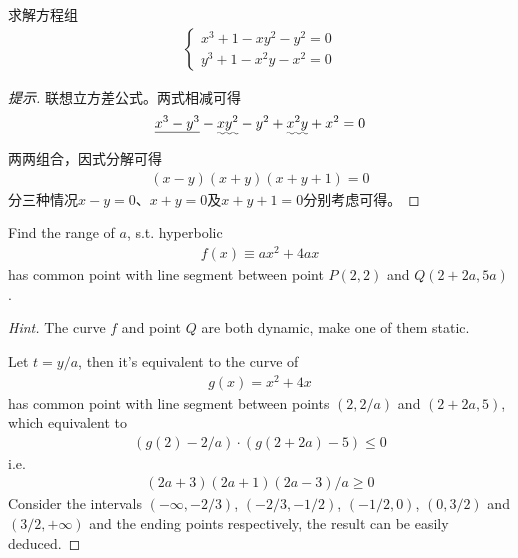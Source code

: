 \begin{example}[德国竞赛题]
  求解方程组
  \begin{align*}
    \begin{cases}
      x^3 + 1 - xy^2 - y^2 = 0\\
      y^3 + 1 - x^2y - x^2 = 0
    \end{cases}
  \end{align*}
\end{example}
\begin{proof}[提示]
  联想立方差公式。两式相减可得
  \begin{align*}
    \underline{x^3 - y^3} - \uwave{xy^2} - y^2 + \uwave{x^2y} + x^2 = 0
  \end{align*}
  两两组合，因式分解可得
  \begin{align*}
    (x-y)(x+y)(x+y+1)=0
  \end{align*}
  分三种情况$x-y=0$、$x+y=0$及$x+y+1=0$分别考虑可得。
\end{proof}


\begin{example}
  Find the range of $a$, s.t. hyperbolic
  \begin{align*}
    f(x)\equiv ax^2 + 4ax
  \end{align*}
  has common point with line segment between point $P(2,2)$ and $Q(2+2a, 5a)$.
\end{example}
\begin{proof}[Hint]
  The curve $f$ and point $Q$ are both dynamic, make one of them static.

  Let $t=y/a$, then it's equivalent to the curve of
  \begin{align*}
    g(x) = x^2 + 4x
  \end{align*}
  has common point with line segment between points $(2, 2/a)$ and $(2+2a, 5)$, which equivalent to
  \begin{align*}
    \left(g(2) - 2/a\right) \cdot \left( g(2+2a) - 5 \right) \le 0
  \end{align*}
  i.e.
  \begin{align*}
    (2a+3)(2a+1)(2a-3)/a \ge 0
  \end{align*}
  Consider the intervals $(-\infty, -2/3)$, $(-2/3, -1/2)$, $(-1/2, 0)$, $(0, 3/2)$ and $(3/2, +\infty)$ and the ending points respectively, the result can be easily deduced.
\end{proof}
